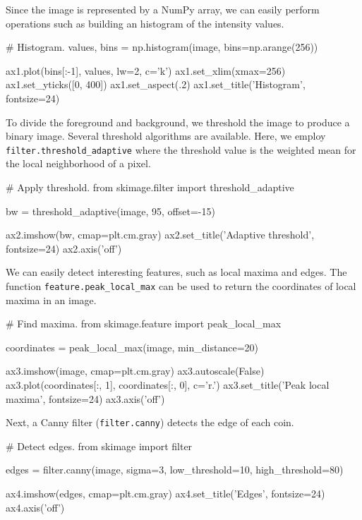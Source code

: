 \documentclass[fleqn,12pt]{wlpeerj}
\begin{document}
Since the image is represented by a NumPy array, we can easily perform operations such as building an histogram of the intensity values.

\begin{python}
# Histogram.
values, bins = np.histogram(image,
bins=np.arange(256))

ax1.plot(bins[:-1], values, lw=2, c='k')
ax1.set_xlim(xmax=256)
ax1.set_yticks([0, 400])
ax1.set_aspect(.2)
ax1.set_title('Histogram', fontsize=24)
\end{python}

To divide the foreground and background, we threshold the image to produce a binary image.  Several threshold algorithms are available. Here, we employ \linebreak\texttt{filter.threshold\_adaptive} where the threshold value is the weighted mean for the local neighborhood of a pixel.

\begin{python}
# Apply threshold.
from skimage.filter import threshold_adaptive

bw = threshold_adaptive(image, 95, offset=-15)

ax2.imshow(bw, cmap=plt.cm.gray)
ax2.set_title('Adaptive threshold', fontsize=24)
ax2.axis('off')
\end{python}

We can easily detect interesting features, such as local maxima and edges. The function \texttt{feature.peak\_local\_max} can be used to return the coordinates of local maxima in an image.

\begin{python}
# Find maxima.
from skimage.feature import peak_local_max

coordinates = peak_local_max(image, min_distance=20)

ax3.imshow(image, cmap=plt.cm.gray)
ax3.autoscale(False)
ax3.plot(coordinates[:, 1],
coordinates[:, 0], c='r.')
ax3.set_title('Peak local maxima', fontsize=24)
ax3.axis('off')
\end{python}

Next, a Canny filter (\texttt{filter.canny}) \citep{Canny} detects the edge of each coin.

\begin{python}
# Detect edges.
from skimage import filter

edges = filter.canny(image, sigma=3,
low_threshold=10,
high_threshold=80)

ax4.imshow(edges, cmap=plt.cm.gray)
ax4.set_title('Edges', fontsize=24)
ax4.axis('off')
\end{python}
\end{document}
